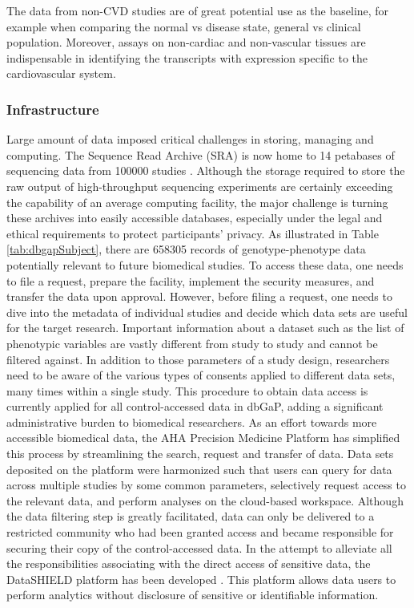 \documentclass[letter]{bioinfo}
\begin{document}
	The data from non-CVD studies are of great potential use as the baseline, for example when comparing the normal vs disease state, general vs clinical population. Moreover, assays on non-cardiac and non-vascular tissues are indispensable in identifying the transcripts with expression specific to the cardiovascular system.
	
	\subsubsection{Infrastructure}
	
	Large amount of data imposed critical challenges in storing, managing and computing. The Sequence Read Archive (SRA) is now home to 14 petabases of sequencing data from 100000 studies \citep{Langmead:2018:Cloud}.
	Although the storage required to store the raw output of high-throughput sequencing experiments are certainly exceeding the capability of an average computing facility, the major challenge is turning these archives into easily accessible databases, especially under the legal and ethical requirements to protect participants' privacy.
	As illustrated in Table \ref{tab:dbgapSubject}, there are 658305 records of genotype-phenotype data potentially relevant to future biomedical studies. To access these data, one needs to file a request, prepare the facility, implement the security measures, and transfer the data upon approval. However, before filing a request, one needs to dive into the metadata of individual studies and decide which data sets are useful for the target research. Important information about a dataset such as the list of phenotypic variables are vastly different from study to study and cannot be filtered against. In addition to those parameters of a study design, researchers need to be aware of the various types of consents applied to different data sets, many times within a single study. This procedure to obtain data access is currently applied for all control-accessed data in dbGaP, adding a significant administrative burden to biomedical researchers.
	As an effort towards more accessible biomedical data, the AHA Precision Medicine Platform \citep{Kass-Hout:2018:American} has simplified this process by streamlining the search, request and transfer of data. Data sets deposited on the platform were harmonized such that users can query for data across multiple studies by some common parameters, selectively request access to the relevant data, and perform analyses on the cloud-based workspace.
	Although the data filtering step is greatly facilitated, data can only be delivered to a restricted community who had been granted access and became responsible for securing their copy of the control-accessed data. In the attempt to alleviate all the responsibilities associating with the direct access of sensitive data, the DataSHIELD platform has been developed \citep{Gaye:2014:DataSHIELD, Wilson:2017:DataSHIELD}. This platform allows data users to perform analytics without disclosure of sensitive or identifiable information.
	
\end{document}
